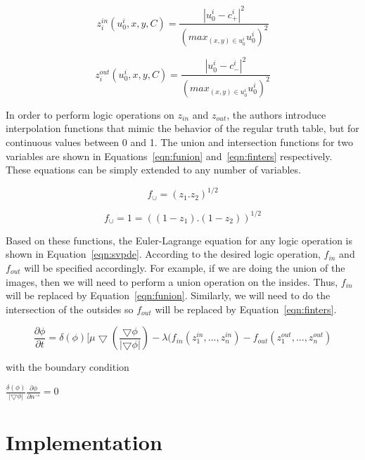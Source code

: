 \documentclass[10pt,twocolumn,letterpaper]{article}
\begin{document}
\begin{equation}
\label{eqn:zin}
z_{i}^{in}(u_{0}^{i},x,y,C) = \frac{|u_{0}^{i} - c_{+}^i|^2}{(max_{(x,y) \in u_{0}^{i}} u_{0}^i)^2}
\end{equation}

\begin{equation}
\label{eqn:zout}
z_{i}^{out}(u_{0}^{i},x,y,C) = \frac{|u_{0}^{i} - c_{-}^i|^2}{(max_{(x,y) \in u_{0}^{i}} u_{0}^i)^2}
\end{equation}

In order to perform logic operations on $z_{in}$ and $z_{out}$, the authors introduce interpolation functions that mimic the behavior of the regular truth
table, but for continuous values between 0 and 1. The union and intersection functions for two variables are shown in Equations~\ref{eqn:funion}
and~\ref{eqn:finters} respectively. These equations can be simply extended to any number of variables.

\begin{equation}
\label{eqn:funion}
f_{\cup} = (z_{1} . z_{2})^{1/2}
\end{equation}

\begin{equation}
\label{eqn:finters}
f_{\cup} = 1 = ((1 - z_{1}) .(1-  z_{2}))^{1/2}
\end{equation}

Based on these functions, the Euler-Lagrange equation for any logic operation is shown in Equation~\ref{eqn:svpde}. According to the desired logic operation,
$f_{in}$ and $f_{out}$ will be specified accordingly. For example, if we are doing the union of the images, then we will need to perform a union operation on
the insides. Thus, $f_{in}$ will be replaced by Equation~\ref{eqn:funion}. Similarly, we will need to do the intersection of the outsides so $f_{out}$ will be
replaced by Equation~\ref{eqn:finters}.

\begin{equation}
\label{eqn:svpde}
\frac{\partial{\phi}}{\partial{t}} = \delta(\phi)[\mu\bigtriangledown(\frac{\bigtriangledown \phi}{|\bigtriangledown \phi|})  - \lambda(f_{in}(z_{1}^{in}, ...,
z_{n}^{in}) - f_{out}(z_{1}^{out}, ..., z_{n}^{out})
\end{equation}

with the boundary condition

$\frac{\delta(\phi)}{|\bigtriangledown\phi|}\frac{\partial\phi}{\partial n^{\rightarrow}} = 0$

\section{Implementation}
\label{sec:implementation}
\end{document}
